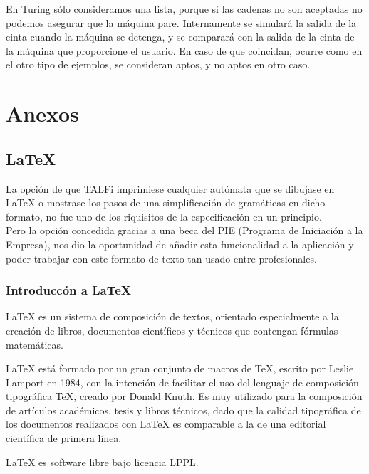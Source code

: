 \documentclass[12pt,a4paper,spanish]{book}
\begin{document}
En Turing s\'olo consideramos una lista, porque si las cadenas no son aceptadas no podemos asegurar que la m\'aquina pare. Internamente se simular\'a la salida de la cinta cuando la m\'aquina se detenga, y se comparar\'a con la salida de la cinta de la m\'aquina que proporcione el usuario. En caso de que coincidan, ocurre como en el otro tipo de ejemplos, se consideran aptos, y no aptos en otro caso.

\chapter{Anexos}
\section{\LaTeX{}}

La opci\'on de que TALFi imprimiese cualquier aut\'omata que se dibujase en {\LaTeX{}} o mostrase los pasos de una simplificaci\'on de gram\'aticas en dicho formato, no fue uno de los riquisitos de la especificaci\'on en un principio.\\
Pero la opci\'on concedida gracias a una beca del PIE (Programa de Iniciaci\'on a la Empresa), nos dio la oportunidad de a\~nadir esta funcionalidad a la aplicaci\'on y poder trabajar con este formato de texto tan usado entre profesionales.\\
\subsection{Introducc\'on a \LaTeX{}}
\LaTeX{} es un sistema de composici\'on de textos, orientado especialmente a la creaci\'on de libros, documentos cient\'ificos y t\'ecnicos que contengan f\'ormulas matem\'aticas.

\LaTeX{} est\'a formado por un gran conjunto de macros de \TeX{}, escrito por Leslie Lamport en 1984, con la intenci\'on de facilitar el uso del lenguaje de composici\'on tipogr\'afica \TeX{}, creado por Donald Knuth. Es muy utilizado para la composici\'on de art\'iculos acad\'emicos, tesis y libros t\'ecnicos, dado que la calidad tipogr\'afica de los documentos realizados con \LaTeX{} es comparable a la de una editorial cient\'ifica de primera l\'inea.

\LaTeX{} es software libre bajo licencia LPPL.

\newpage
\end{document}
